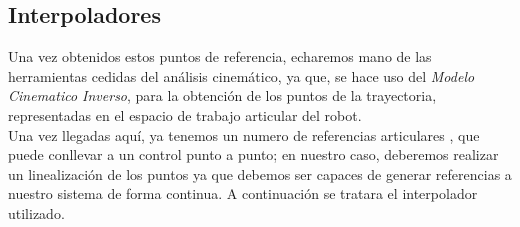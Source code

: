 \subsection{Interpoladores}
Una vez obtenidos estos puntos de referencia, echaremos mano de las herramientas cedidas del análisis cinemático, ya que, se hace uso
del \textit{Modelo Cinematico Inverso}, para la obtención de los puntos de la trayectoria, representadas en el espacio de trabajo
articular del robot.\\


Una vez llegadas aquí, ya tenemos un numero de referencias articulares , que puede conllevar a un control punto a punto;
en nuestro caso, deberemos realizar un linealización de los puntos ya que debemos ser capaces de generar referencias a nuestro sistema
de forma continua. A continuación se tratara el interpolador utilizado.

